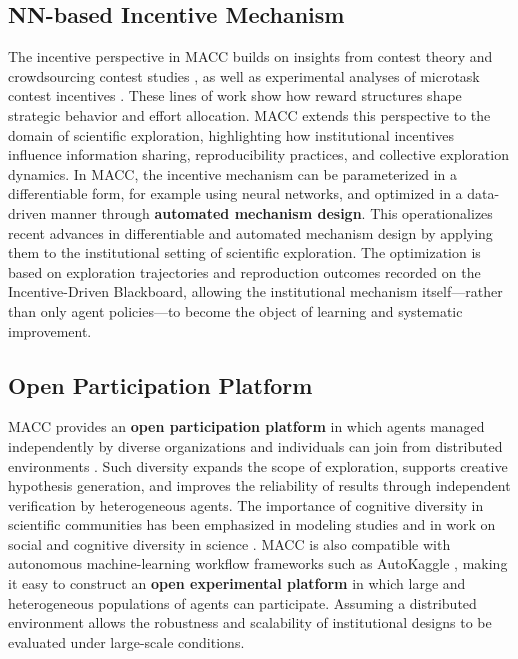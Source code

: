 \documentclass[sigconf]{aamas}
\begin{document}
\subsection{NN-based Incentive Mechanism}

The incentive perspective in MACC builds on insights from contest
theory and crowdsourcing contest studies
\cite{moldovanu2001optimal, moldovanu2006contest, dipalantino2009crowdsourcing, archak2009optimal},
as well as experimental analyses of microtask contest incentives
\cite{feyisetan2019beyond}. These lines of work show how reward
structures shape strategic behavior and effort allocation. MACC extends
this perspective to the domain of scientific exploration, highlighting
how institutional incentives influence information sharing,
reproducibility practices, and collective exploration dynamics.
In MACC, the incentive mechanism can be parameterized in a
differentiable form, for example using neural networks, and optimized
in a data-driven manner through \textbf{automated mechanism design}. This operationalizes recent advances in differentiable
and automated mechanism design
\cite{dutting2024optimal, Duetting2024MechanismDesignLLMs, Curry2025AMDSurvey}
by applying them to the institutional setting of scientific
exploration. The optimization is based on exploration trajectories and
reproduction outcomes recorded on the Incentive-Driven Blackboard,
allowing the institutional mechanism itself—rather than only agent
policies—to become the object of learning and systematic improvement.

\subsection{Open Participation Platform}

MACC provides an \textbf{open participation platform} in which agents managed independently by diverse organizations and individuals can join from distributed environments \cite{dinverno2012communicating}. Such diversity expands the scope of exploration, supports creative hypothesis generation, and improves the reliability of results through independent verification by heterogeneous agents. The importance of cognitive diversity in scientific communities has been emphasized in modeling studies \cite{oconnor2023modelling} and in work on social and cognitive diversity in science \cite{Rolin2023SocialCognitiveDiversity}.
MACC is also compatible with autonomous machine-learning workflow frameworks such as AutoKaggle \cite{li2024autokaggle}, making it easy to construct an \textbf{open experimental platform} in which large and heterogeneous populations of agents can participate. Assuming a distributed environment allows the robustness and scalability of institutional designs to be evaluated under large-scale conditions.
\end{document}
